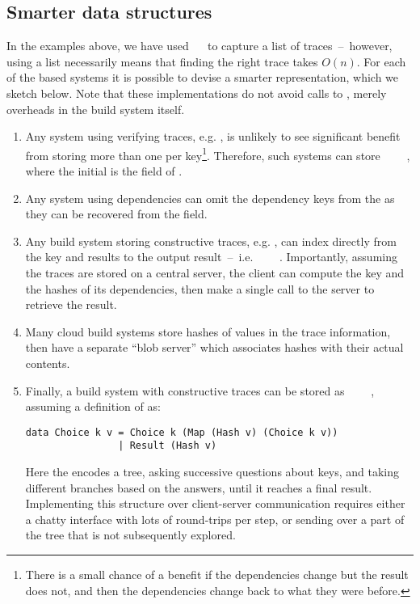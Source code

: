 \subsection{Smarter \hs{[Trace]} data structures}\label{sec-smart-traces}

In the examples above, we have used \hs{[Trace}~~\hs{v]} to capture a list
of traces~--~however, using a list necessarily means that finding the right trace
takes $O(n)$. For each of the  based systems it is possible to devise
a smarter representation, which we sketch below. Note that these implementations
do not avoid calls to , merely overheads in the build system itself.

\begin{enumerate}
\item Any system using verifying traces, e.g. \Shake, is unlikely to see significant benefit from storing more than one  per key\footnote{There is a small chance of a benefit if the dependencies change but the result does not, and then the dependencies change back to what they were before.}. Therefore, such systems can store ~~~~, where the initial  is the  field of .
\item Any system using  dependencies can omit the dependency keys from the  as they can be recovered from the  field.
\item Any  build system storing constructive traces, e.g. \Bazel, can index directly from the key and results to the output result~--~i.e. ~~\hs{[Hash}~\hs{v])}~. Importantly, assuming the traces are stored on a central server, the client can compute the key and the hashes of its dependencies, then make a single call to the server to retrieve the result.
\item Many cloud build systems store hashes of values in the trace information, then have a separate ``blob server'' which associates hashes with their actual contents.
\item Finally, a  build system with constructive traces can be stored as ~~~~, assuming a definition of  as:
\begin{verbatim}
data Choice k v = Choice k (Map (Hash v) (Choice k v))
                | Result (Hash v)
\end{verbatim}
Here the  encodes a tree, asking successive questions about keys, and taking different branches based on the answers, until it reaches a final result. Implementing this structure over client-server communication requires either a chatty interface with lots of round-trips per  step, or sending over a part of the tree that is not subsequently explored.
\end{enumerate}

